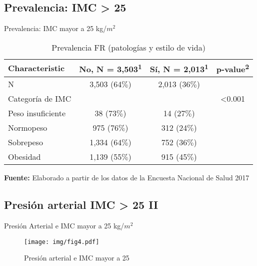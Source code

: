 \documentclass[aspectratio=169]{beamer}
\begin{document}
\subsection*{Prevalencia: IMC > 25}
\begin{frame}{Prevalencia: IMC mayor a 25 kg/$m^2$}
    \begin{table}[]
\caption{\small \small Prevalencia FR (patologías y estilo de vida)}
    \centering
    \small

    \captionsetup[table]{labelformat=empty,skip=1pt}
\begin{tabular}{lccc}
\toprule
\textbf{Characteristic} & \textbf{No}, N = 3,503\textsuperscript{1} & \textbf{Sí}, N = 2,013\textsuperscript{1} & \textbf{p-value}\textsuperscript{2} \\ 
\midrule
N & 3,503 (64$\%$) & 2,013 (36$\%$) &  \\ 
Categoría de IMC &  &  & <0.001 \\ 
\-\hspace{5mm} \small Peso insuficiente & 38 (73$\%$) & 14 (27$\%$) &  \\ 
\-\hspace{5mm} \small Normopeso & 975 (76$\%$) & 312 (24$\%$) &  \\ 
\-\hspace{5mm} \small Sobrepeso & 1,334 (64$\%$) & 752 (36$\%$) &  \\ 
\-\hspace{5mm} \small Obesidad & 1,139 (55$\%$) & 915 (45$\%$) &  \\ 
 \bottomrule
\end{tabular}
    \vspace{5mm}
    
    {\raggedright \small \textbf{Fuente:} Elaborado a partir de los datos de la Encuesta Nacional de Salud 2017 \par}
\end{table}
\end{frame}

\subsection*{Presión arterial IMC > 25 II}
\begin{frame}{Presión Arterial e IMC mayor a 25 kg/$m^2$}
    \begin{figure}
        \centering
        \texttt{[image: img/fig4.pdf]}
        \caption{Presión arterial e IMC mayor a 25}
        \label{fig:my_label}
    \end{figure}
\end{frame}
\end{document}
